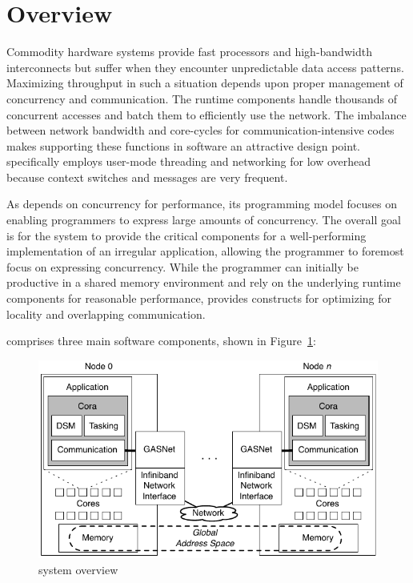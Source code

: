 \section{\Grappa Overview}

Commodity hardware systems provide fast processors and high-bandwidth
interconnects but suffer when they encounter unpredictable data access
patterns. Maximizing throughput in such a situation depends upon proper
management of concurrency and communication. The \Grappa runtime
components handle thousands of concurrent accesses and batch them to
efficiently use the network. The imbalance between network bandwidth
and core-cycles for communication-intensive codes makes supporting
these functions in software an attractive design point. 
\Grappa specifically employs user-mode threading and networking for
low overhead because context switches and messages are very frequent.

As \Grappa depends on concurrency for performance, its programming
model focuses on enabling programmers to express large amounts of
concurrency. The overall goal is for the system to provide the
critical components for a well-performing implementation of an
irregular application, allowing the programmer to foremost focus on
expressing concurrency. While the programmer can initially be
productive in a shared memory environment and rely on the
underlying runtime components for reasonable performance, \Grappa
provides constructs for optimizing for locality and overlapping
communication.

\Grappa comprises three main software components, shown in Figure~\ref{fig:grappa}:

\begin{figure}[t]
\begin{center}
  \includegraphics[width=0.95\columnwidth]{figs/system-overview}
\begin{minipage}{0.95\columnwidth}
  \caption{\label{fig:grappa} \Grappa system overview}
\end{minipage}
\vspace{-3ex}
\end{center}
\end{figure}

